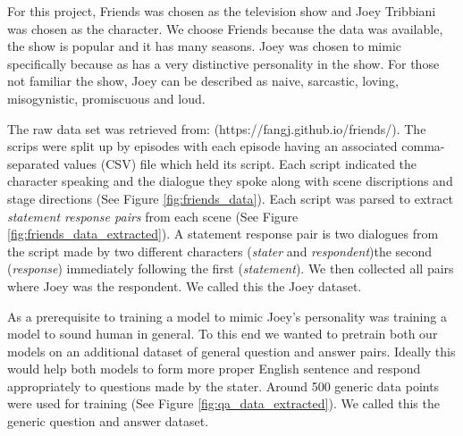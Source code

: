 For this project, Friends was chosen as the television show and Joey Tribbiani was chosen as the character. 
We choose Friends because the data was available, the show is popular and it has many seasons.
Joey was chosen to mimic specifically because as has a very distinctive personality in the show. 
For those not familiar the show, Joey can be described as naive, sarcastic, loving, misogynistic, promiscuous and loud.

The raw data set was retrieved from: (https://fangj.github.io/friends/). 
The scrips were split up by episodes with each episode having an associated comma-separated values (CSV) file which held its script.
Each script indicated the character speaking and the dialogue they spoke along with scene discriptions and stage directions (See Figure \ref{fig:friends_data}).
Each script was parsed to extract \emph{statement response pairs} from each scene (See Figure \ref{fig:friends_data_extracted}).
A statement response pair is two dialogues from the script made by two different characters (\emph{stater} and \emph{respondent})the second (\emph{response}) immediately following the first (\emph{statement}).
We then collected all pairs where Joey was the respondent.
We called this the Joey dataset.


As a prerequisite to training a model to mimic Joey's personality was training a model to sound human in general.
To this end we wanted to pretrain both our models on an additional dataset of general question and answer pairs. 
Ideally this would help both models to form more proper English sentence and respond appropriately to questions made by the stater.
Around 500 generic data points were used for training (See Figure \ref{fig:qa_data_extracted}).
We called this the generic question and answer dataset.



